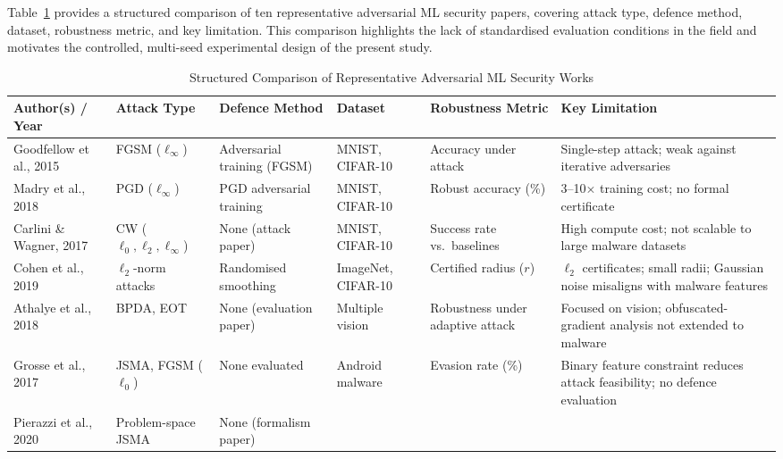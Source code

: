 \documentclass[conference]{IEEEtran}
\begin{document}
Table~\ref{tab:related_work} provides a structured comparison of ten representative adversarial ML security papers, covering attack type, defence method, dataset, robustness metric, and key limitation. This comparison highlights the lack of standardised evaluation conditions in the field and motivates the controlled, multi-seed experimental design of the present study.

\begin{table}[!ht]
\centering
\caption{Structured Comparison of Representative Adversarial ML Security Works}
\label{tab:related_work}
\setlength{\tabcolsep}{4pt}
\begin{tabular}{p{2.6cm}p{2.1cm}p{2.5cm}p{2.2cm}p{2.1cm}p{3.8cm}}
\toprule
\textbf{Author(s) / Year} & \textbf{Attack Type} & \textbf{Defence Method} & \textbf{Dataset} & \textbf{Robustness Metric} & \textbf{Key Limitation} \\
\midrule
Goodfellow et al., 2015 \cite{goodfellow2015}
  & FGSM ($\ell_\infty$)
  & Adversarial training (FGSM)
  & MNIST, CIFAR-10
  & Accuracy under attack
  & Single-step attack; weak against iterative adversaries \\
\addlinespace
Madry et al., 2018 \cite{madry2018}
  & PGD ($\ell_\infty$)
  & PGD adversarial training
  & MNIST, CIFAR-10
  & Robust accuracy (\%)
  & 3--10$\times$ training cost; no formal certificate \\
\addlinespace
Carlini \& Wagner, 2017 \cite{carlini2017}
  & CW ($\ell_0,\ell_2,\ell_\infty$)
  & None (attack paper)
  & MNIST, CIFAR-10
  & Success rate vs.\ baselines
  & High compute cost; not scalable to large malware datasets \\
\addlinespace
Cohen et al., 2019 \cite{cohen2019}
  & $\ell_2$-norm attacks
  & Randomised smoothing
  & ImageNet, CIFAR-10
  & Certified radius ($r$)
  & $\ell_2$ certificates; small radii; Gaussian noise misaligns with malware features \\
\addlinespace
Athalye et al., 2018 \cite{athalye2018}
  & BPDA, EOT
  & None (evaluation paper)
  & Multiple vision
  & Robustness under adaptive attack
  & Focused on vision; obfuscated-gradient analysis not extended to malware \\
\addlinespace
Grosse et al., 2017 \cite{grosse2017}
  & JSMA, FGSM ($\ell_0$)
  & None evaluated
  & Android malware
  & Evasion rate (\%)
  & Binary feature constraint reduces attack feasibility; no defence evaluation \\
\addlinespace
Pierazzi et al., 2020 \cite{pierazzi2020}
  & Problem-space JSMA
  & None (formalism paper)

\end{tabular}
\end{table}
\end{document}
